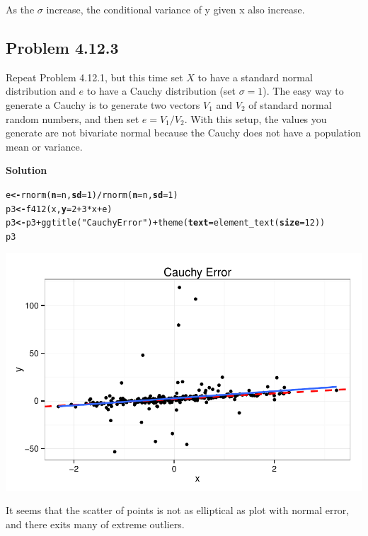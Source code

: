 \documentclass[12pt,oneside,a4paper]{article}\usepackage[]{graphicx}\usepackage[]{xcolor}
\makeatletter
\newcommand{\hlnum}[1]{\textcolor[rgb]{0,0,0}{#1}}%
\newcommand{\hlstr}[1]{\textcolor[rgb]{0,0,1}{#1}}%
\newcommand{\hlopt}[1]{\textcolor[rgb]{0,0,0}{#1}}%
\newcommand{\hlstd}[1]{\textcolor[rgb]{0,0,0}{#1}}%
\newcommand{\hlkwb}[1]{\textcolor[rgb]{0.498,0,0.333}{\textbf{#1}}}%
\newcommand{\hlkwc}[1]{\textcolor[rgb]{0.498,0,0.333}{\textbf{#1}}}%
\newcommand{\hlkwd}[1]{\textcolor[rgb]{0,0,0}{#1}}%
\newenvironment{kframe}{%
 \def\at@end@of@kframe{}%
 \ifinner\ifhmode%
  \def\at@end@of@kframe{\end{minipage}}%
  \begin{minipage}{\columnwidth}%
 \fi\fi%
 \def\FrameCommand##1{\hskip\@totalleftmargin \hskip-\fboxsep
 \colorbox{shadecolor}{##1}\hskip-\fboxsep
     \hskip-\linewidth \hskip-\@totalleftmargin \hskip\columnwidth}%
 \MakeFramed {\advance\hsize-\width
   \@totalleftmargin\z@ \linewidth\hsize
   \@setminipage}}%
 {\par\unskip\endMakeFramed%
 \at@end@of@kframe}
\newenvironment{knitrout}{}{} %
\newcommand{\subproblem}[1]
{
    \subsection*{Problem {#1}}
}
\newcommand{\solution}
{
    \vspace{15pt}
    \noindent\ignorespaces\textbf{\large Solution}
}
\makeatother
\begin{document}
As the $\sigma$ increase, the conditional variance of y given x also increase.

\subproblem{4.12.3}
Repeat Problem 4.12.1, but this time set $X$ to have a standard normal distribution and $e$ to have a Cauchy distribution (set $\sigma = 1$). The easy way to generate a Cauchy is to generate two vectors $V_{1}$ and $V_{2}$ of standard normal random numbers, and then set $e = V_{1}/V_{2}$. With this setup, the values you generate are not bivariate normal because the Cauchy does not have a population mean or variance.

\solution
\begin{knitrout}
\color{fgcolor}\begin{kframe}
\begin{alltt}
\hlstd{e} \hlkwb{<-} \hlkwd{rnorm}\hlstd{(}\hlkwc{n} \hlstd{= n,} \hlkwc{sd} \hlstd{=} \hlnum{1}\hlstd{)} \hlopt{/} \hlkwd{rnorm}\hlstd{(}\hlkwc{n} \hlstd{= n,} \hlkwc{sd} \hlstd{=} \hlnum{1}\hlstd{)}
\hlstd{p3} \hlkwb{<-} \hlkwd{f412}\hlstd{(x,} \hlkwc{y} \hlstd{=} \hlnum{2} \hlopt{+} \hlnum{3} \hlopt{*} \hlstd{x} \hlopt{+} \hlstd{e)}
\hlstd{p3} \hlkwb{<-} \hlstd{p3} \hlopt{+} \hlkwd{ggtitle}\hlstd{(}\hlstr{"Cauchy Error"}\hlstd{)} \hlopt{+} \hlkwd{theme}\hlstd{(}\hlkwc{text} \hlstd{=} \hlkwd{element_text}\hlstd{(}\hlkwc{size} \hlstd{=} \hlnum{12}\hlstd{))}
\hlstd{p3}
\end{alltt}
\end{kframe}

{\centering \includegraphics[width=.8\linewidth]{figure/p4123} 

}



\end{knitrout}

It seems that the scatter of points is not as elliptical as plot with normal error, and there exits many of extreme outliers.
\end{document}
